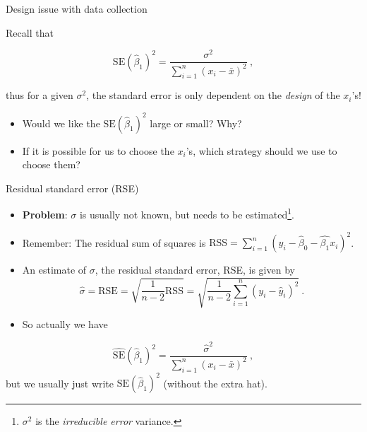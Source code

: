 \documentclass[10pt,ignorenonframetext,]{beamer}
\begin{document}
\begin{frame}

\begin{block}{Design issue with data collection}

\vspace{2mm}

Recall that

\[\text{SE}(\hat{\beta}_1)^2 = \frac{\sigma^2}{\sum_{i=1}^n (x_i-\bar{x})^2} \ ,\]

thus for a given \(\sigma^2\), the standard error is only dependent on
the \emph{design} of the \(x_i\)'s!

\vspace{2mm}

\begin{itemize}
\item
  Would we like the \(\text{SE}(\hat{\beta}_1)^2\) large or small? Why?
\item
  If it is possible for us to choose the \(x_i\)'s, which strategy
  should we use to choose them?
\end{itemize}

\vspace{4cm}

\end{block}

\end{frame}

\begin{frame}

\begin{block}{Residual standard error (RSE)}

\vspace{2mm}

\begin{itemize}
\item
  \textbf{Problem}: \(\sigma\) is usually not known, but needs to be
  estimated\footnote{$\sigma^2$ is the \emph{irreducible error} variance.}.
\item
  Remember: The residual sum of squares is
  \(\text{RSS}=\sum_{i=1}^n (y_i-\hat{\beta}_0-\hat{\beta_1}x_{i})^2\).
\item
  An estimate of \(\sigma\), the residual standard error, RSE, is given
  by
  \[\hat\sigma = \text{RSE}  =\sqrt{\frac{1}{n-2} \text{RSS}} = \sqrt{\frac{1}{n-2}\sum_{i=1}^n (y_i -\hat{y}_i)^2} \ .\]
\item
  So actually we have
\end{itemize}

\[\hat{\text{SE}}(\hat{\beta}_1)^2 = \frac{{\hat\sigma}^2}{\sum_{i=1}^n (x_i-\bar{x})^2} \ ,\]
but we usually just write \({\text{SE}}(\hat{\beta}_1)^2\) (without the
extra hat).

\end{block}

\end{frame}
\end{document}
